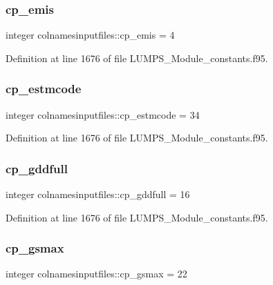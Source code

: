 \subsubsection{\texorpdfstring{cp\+\_\+emis}{cp\_emis}}
{\footnotesize\ttfamily integer colnamesinputfiles\+::cp\+\_\+emis = 4}



Definition at line 1676 of file L\+U\+M\+P\+S\+\_\+\+Module\+\_\+constants.\+f95.

\mbox{\label{namespacecolnamesinputfiles_a9d8a7aee77237f63b58fe379accd6ca9}} 
\subsubsection{\texorpdfstring{cp\+\_\+estmcode}{cp\_estmcode}}
{\footnotesize\ttfamily integer colnamesinputfiles\+::cp\+\_\+estmcode = 34}



Definition at line 1676 of file L\+U\+M\+P\+S\+\_\+\+Module\+\_\+constants.\+f95.

\mbox{\label{namespacecolnamesinputfiles_adec15ce8b05af8e73e70f6b580302216}} 
\subsubsection{\texorpdfstring{cp\+\_\+gddfull}{cp\_gddfull}}
{\footnotesize\ttfamily integer colnamesinputfiles\+::cp\+\_\+gddfull = 16}



Definition at line 1676 of file L\+U\+M\+P\+S\+\_\+\+Module\+\_\+constants.\+f95.

\mbox{\label{namespacecolnamesinputfiles_a0d5b92d88004a89290246da71f7158e6}} 
\subsubsection{\texorpdfstring{cp\+\_\+gsmax}{cp\_gsmax}}
{\footnotesize\ttfamily integer colnamesinputfiles\+::cp\+\_\+gsmax = 22}



